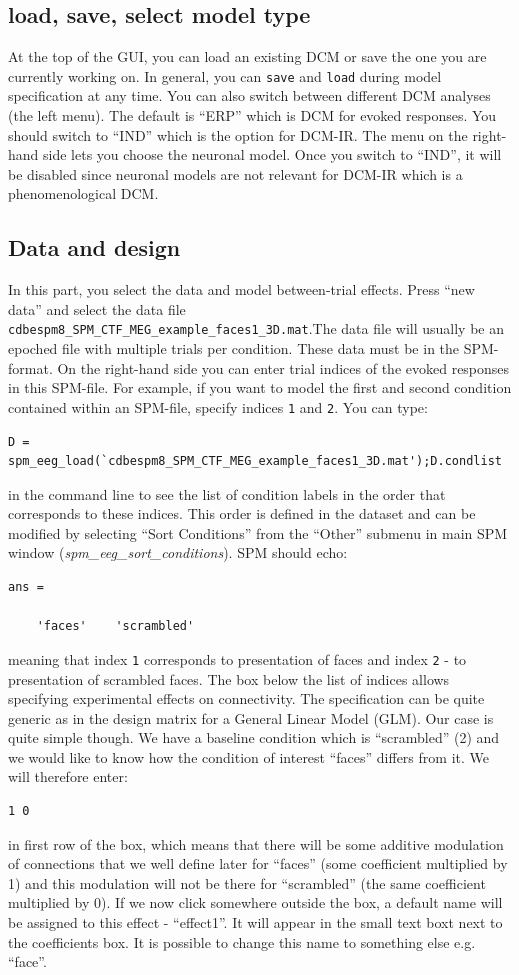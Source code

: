 \subsection{load, save, select model type}
At the top of the GUI, you can load an existing DCM or save the one you are currently working on. In general, you can \texttt{save} and \texttt{load} during model specification at any time. You can also switch between different DCM analyses (the left menu). The default is ``ERP'' which is DCM for evoked responses. You should switch to ``IND'' which is the option for DCM-IR. The menu on the right-hand side lets you choose the neuronal model. Once you switch to ``IND'', it will be disabled since neuronal models are not relevant for DCM-IR which is a phenomenological DCM.

\subsection{Data and design}
In this part, you select the data and model between-trial effects. Press ``new data'' and select the data file \texttt{cdbespm8\_\-SPM\_\-CTF\_\-MEG\_\-example\_\-faces1\_\-3D.mat}.The data file will usually be an epoched file with multiple trials per condition. These data must be in the SPM-format. On the right-hand side you can enter trial indices of the evoked responses in this SPM-file. For example, if you want to model the first and second condition contained within an SPM-file, specify
indices \texttt{1} and \texttt{2}. You can type:
\begin{verbatim}
D = spm_eeg_load(`cdbespm8_SPM_CTF_MEG_example_faces1_3D.mat');D.condlist
\end{verbatim}
in the command line to see the list of condition labels in the order that corresponds to these indices. This order is defined in the dataset and can be modified by selecting ``Sort Conditions'' from the ``Other'' submenu in main SPM window (\textit{spm\_eeg\_sort\_conditions}). SPM should echo:
\begin{verbatim}
ans = 

    'faces'    'scrambled'
\end{verbatim}
meaning that index \texttt{1} corresponds to presentation of faces and index \texttt{2} - to presentation of scrambled faces. The box below the list of indices allows specifying experimental effects on connectivity. The specification can be quite generic as in the design matrix for a General Linear Model (GLM). Our case is quite simple though. We have a baseline condition which is ``scrambled'' (2) and we would like to know how the condition of interest ``faces'' differs from it. We will therefore enter:
\begin{verbatim}
1 0
\end{verbatim}
in first row of the box, which means that there will be some additive modulation of connections that we well define later for ``faces''  (some coefficient multiplied by 1) and this modulation will not be there for ``scrambled'' (the same coefficient multiplied by 0). If we now click somewhere outside the box, a default name will be assigned to this effect - ``effect1''. It will appear in the small text boxt next to the coefficients box. It is possible to change this name to something else e.g. ``face''.

